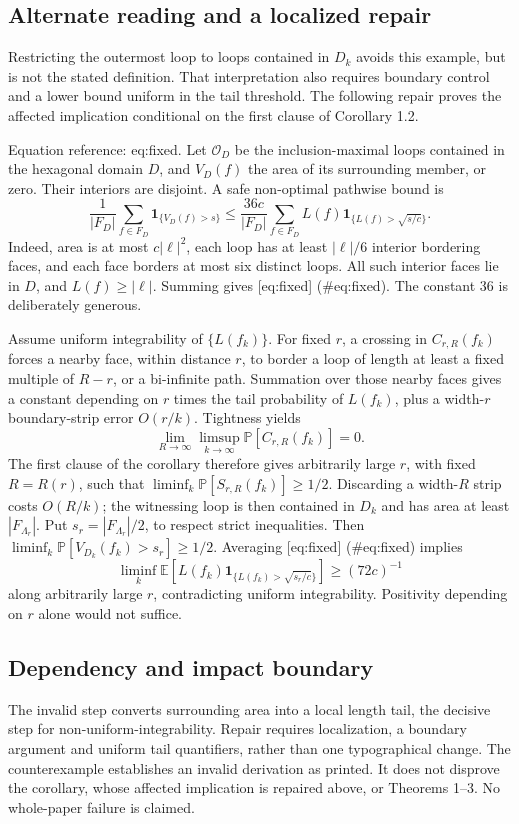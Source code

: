 \documentclass[10pt]{article}
\begin{document}
\subsection*{Alternate reading and a localized repair}
Restricting the outermost loop to loops contained in \(D_k\) avoids this example, but is not the stated definition. That interpretation also requires boundary control and a lower bound uniform in the tail threshold. The following repair proves the affected implication conditional on the first clause of Corollary 1.2.\par
Equation reference: eq:fixed. Let \(\mathcal O_D\) be the inclusion-maximal loops contained in the hexagonal domain \(D\), and \(V_D(f)\) the area of its surrounding member, or zero. Their interiors are disjoint. A safe non-optimal pathwise bound is \[
\frac1{|F_D|}\sum_{f\in F_D}\mathbf1_{\{V_D(f)>s\}}
\le\frac{36c}{|F_D|}\sum_{f\in F_D}
L(f)\mathbf1_{\{L(f)>\sqrt{s/c}\}} .\] Indeed, area is at most \(c|\ell|^2\), each loop has at least \(|\ell|/6\) interior bordering faces, and each face borders at most six distinct loops. All such interior faces lie in \(D\), and \(L(f)\ge|\ell|\). Summing gives [eq:fixed] (\#eq:fixed). The constant 36 is deliberately generous.\par
Assume uniform integrability of \(\{L(f_k)\}\). For fixed \(r\), a crossing in \(C_{r,R}(f_k)\) forces a nearby face, within distance \(r\), to border a loop of length at least a fixed multiple of \(R-r\), or a bi-infinite path. Summation over those nearby faces gives a constant depending on \(r\) times the tail probability of \(L(f_k)\), plus a width-\(r\) boundary-strip error \(O(r/k)\). Tightness yields \[\lim_{R\to\infty}\limsup_{k\to\infty}\mathbb P[C_{r,R}(f_k)]=0 .\] The first clause of the corollary therefore gives arbitrarily large \(r\), with fixed \(R=R(r)\), such that \(\liminf_k\mathbb P[S_{r,R}(f_k)]\ge1/2\). Discarding a width-\(R\) strip costs \(O(R/k)\); the witnessing loop is then contained in \(D_k\) and has area at least \(|F_{\Lambda_r}|\). Put \(s_r=|F_{\Lambda_r}|/2\), to respect strict inequalities. Then \(\liminf_k\mathbb P[V_{D_k}(f_k)>s_r]\ge1/2\). Averaging [eq:fixed] (\#eq:fixed) implies \[\liminf_k\mathbb E[L(f_k)\mathbf1_{\{L(f_k)>\sqrt{s_r/c}\}}]
\ge(72c)^{-1}\] along arbitrarily large \(r\), contradicting uniform integrability. Positivity depending on \(r\) alone would not suffice.\par
\subsection*{Dependency and impact boundary}
The invalid step converts surrounding area into a local length tail, the decisive step for non-uniform-integrability. Repair requires localization, a boundary argument and uniform tail quantifiers, rather than one typographical change. The counterexample establishes an invalid derivation as printed. It does not disprove the corollary, whose affected implication is repaired above, or Theorems 1–3. No whole-paper failure is claimed.\par
\end{document}
